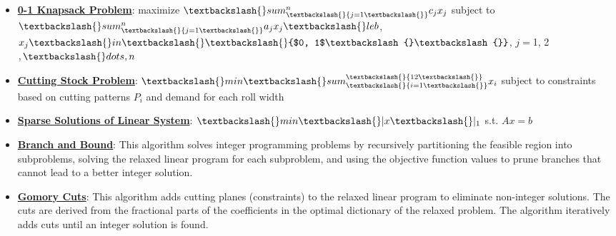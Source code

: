 \documentclass{article}%
\begin{document}
\begin{itemize}[leftmargin=*]
\item \href{https://www.math.purdue.edu/~yipn/421/2024-10-28-ApplsLinProg.pdf#page=24}{\textbf{0{-}1 Knapsack Problem}}: maximize $\textbackslash{}sum_\textbackslash{}{j=1\textbackslash{}}^n c_j x_j$ subject to $\textbackslash{}sum_\textbackslash{}{j=1\textbackslash{}}^n a_j x_j \textbackslash{}le b$, $x_j \textbackslash{}in \textbackslash{}\textbackslash{}{$0, 1$\textbackslash{}\textbackslash{}}$, $j = $1, 2$, \textbackslash{}dots, n$%
\item \href{https://www.math.purdue.edu/~yipn/421/2024-10-28-ApplsLinProg.pdf#page=29}{\textbf{Cutting Stock Problem}}: $\textbackslash{}min \textbackslash{}sum_\textbackslash{}{i=1\textbackslash{}}^\textbackslash{}{12\textbackslash{}} x_i$ subject to constraints based on cutting patterns $P_i$ and demand for each roll width%
\item \href{https://www.math.purdue.edu/~yipn/421/2024-10-28-ApplsLinProg.pdf#page=34}{\textbf{Sparse Solutions of Linear System}}: $\textbackslash{}min \textbackslash{}|x\textbackslash{}|_1$ s.t. $Ax = b$%
\end{itemize}%
\begin{itemize}[leftmargin=*]%
\item \href{https://www.math.purdue.edu/~yipn/421/2024-10-31-IntLinProg.pdf#page=5}{\textbf{Branch and Bound}}: This algorithm solves integer programming problems by recursively partitioning the feasible region into subproblems, solving the relaxed linear program for each subproblem, and using the objective function values to prune branches that cannot lead to a better integer solution.%
\item \href{https://www.math.purdue.edu/~yipn/421/2024-10-31-IntLinProg.pdf#page=15}{\textbf{Gomory Cuts}}: This algorithm adds cutting planes (constraints) to the relaxed linear program to eliminate non-integer solutions. The cuts are derived from the fractional parts of the coefficients in the optimal dictionary of the relaxed problem. The algorithm iteratively adds cuts until an integer solution is found.%
\end{itemize}%
\end{document}
